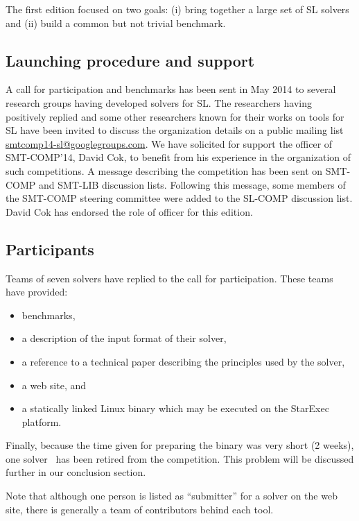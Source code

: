 \documentclass{llncs}
\begin{document}
The first edition focused on two goals:
(i) bring together a large set of SL solvers and
(ii) build a common but not trivial benchmark. 

\subsection{Launching procedure and support}
A call for participation and benchmarks has been sent
in May 2014 %
to several research groups 
having developed solvers for SL.
The researchers having positively replied and some other researchers known for their works on tools for SL have been invited to discuss the organization details on a public mailing list \url{smtcomp14-sl@googlegroups.com}.
We have solicited for support the officer of SMT-COMP'14, David Cok, to benefit from his experience in the organization of such competitions.
A message describing the competition has been sent on SMT-COMP and SMT-LIB discussion lists. Following this message, some members of the SMT-COMP steering committee were added to the SL-COMP discussion list. 
David Cok has endorsed the role of officer for this edition.


\subsection{Participants}
Teams of seven solvers have replied to the call for participation.
These teams have provided:
\begin{itemize}
\item benchmarks, 
\item a description of the input format of their solver, 
\item a reference to a technical paper describing the principles used by the solver, 
\item a web site, and
\item a statically linked Linux binary which may be executed on the StarExec platform.
\end{itemize}
Finally, because the time given for preparing the binary was very short (2 weeks), one solver~\cite{HasseIOP13}
has been retired from the competition. This problem will be discussed further in our conclusion section.

Note that although one person is listed as ``submitter'' for a solver on the web site,
there is generally a team of contributors behind each tool.
\end{document}
